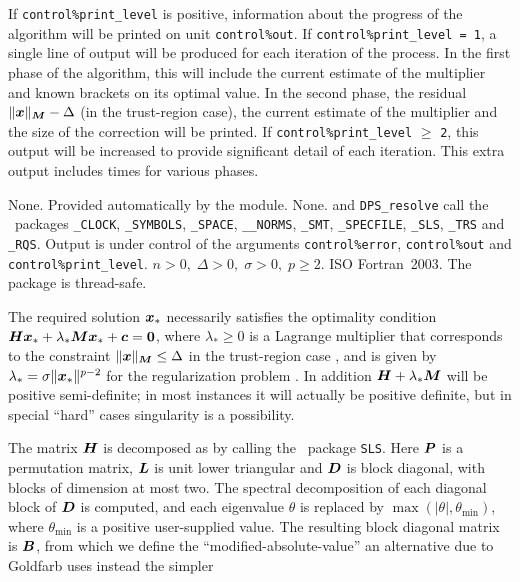 \documentclass{galahad}
\newcommand{\packagename}{DPS}
\begin{document}

\galinfo
If {\tt control\%print\_level} is positive, information about the progress
of the algorithm will be printed on unit {\tt control\-\%\-out}.
If {\tt control\%print\_level = 1}, a single line of output will be produced
for each iteration of the process. In the first phase of the algorithm,
this will include the current estimate of the multiplier and known
brackets on its optimal value. In the second phase, the residual
$\|{\bm{x}}\|_{{\bm{M}}} - \Delta$ (in the trust-region case), the current
estimate of the multiplier and the size of the correction will be printed.
If {\tt control\%print\_level} $\geq$ {\tt 2}, this
output will be increased to provide significant detail of each iteration.
This extra output includes times for various phases.


\galgeneral

\galcommon None.
\galworkspace Provided automatically by the module.
\galroutines None.
\galmodules {\tt \packagename\_solve} and {\tt \packagename\_resolve}
call the \galahad\ packages
{\tt \libraryname\_CLOCK},
{\tt \libraryname\_SY\-M\-BOLS},
{\tt \libraryname\_\-SPACE},
{\tt \libraryname\_\_\-NORMS},
{\tt \libraryname\-\_SMT},
{\tt \libraryname\_SPECFILE},
{\tt \libraryname\_SLS},
{\tt \libraryname\_TRS}
and
{\tt \libraryname\_RQS}.
\galio Output is under control of the arguments
{\tt control\%error}, {\tt control\%out} and {\tt control\%print\_level}.
\galrestrictions $n  >  0, \;  \Delta  >  0, \;  \sigma  >  0, \;  p  \geq  2$.
\galportability ISO Fortran~2003.
The package is thread-safe.


\galmethod
The required solution ${\bm{x}}_*$ necessarily satisfies the optimality condition
${\bm{H}} {\bm{x}}_* + \lambda_* {\bm{M}} {\bm{x}}_* + {\bm{c}} = {\bm{0}}$,
where $\lambda_* \geq 0$ is a Lagrange
multiplier that corresponds to the constraint
$\|{\bm{x}}\|_{{\bm{M}}}  \leq  \Delta$ in the trust-region case ,
and is given by $\lambda_* = \sigma \|{\bm{x}}_*\|^{p-2}$
for the regularization problem .
In addition ${\bm{H}} + \lambda_* {\bm{M}}$ will be positive semi-definite; in
most instances it will actually be positive definite, but in special
``hard'' cases singularity is a possibility.

The matrix ${\bm{H}}$ is decomposed as
by calling the \galahad\ package {\tt SLS}.
Here ${\bm{P}}$ is a permutation matrix,
${\bm{L}}$ is unit lower triangular and ${\bm{D}}$ is block diagonal, with
blocks of dimension at most two. The spectral decomposition of each diagonal
block of ${\bm{D}}$ is computed, and each eigenvalue $\theta$ is replaced by
$\max ( | \theta | , \theta_{\min} ) $,
where $\theta_{\min}$ is a positive user-supplied value. The resulting block
diagonal matrix is ${\bm{B}}$, from which we define the ``modified-absolute-value''
an alternative due to Goldfarb uses instead the simpler
\end{document}
